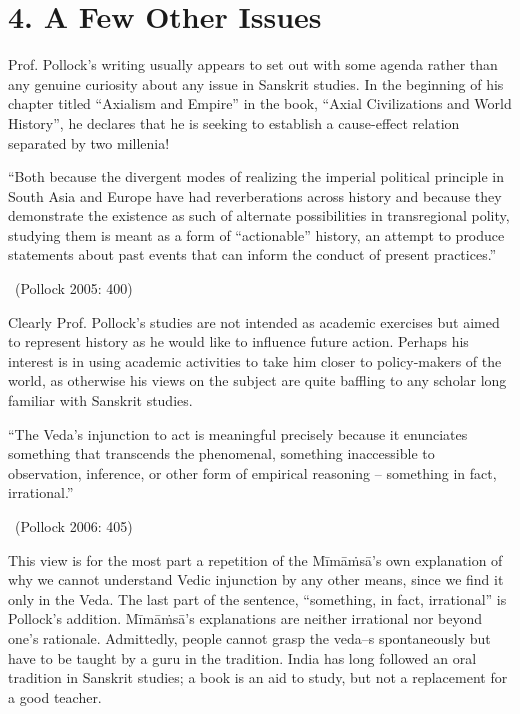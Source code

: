 \section*{4. A Few Other Issues}

Prof. Pollock’s writing usually appears to set out with some agenda rather than any genuine curiosity about any issue in Sanskrit studies. In the beginning of his chapter titled “Axialism and Empire” in the book, “Axial Civilizations and World History”, he declares that he is seeking to establish a cause-effect relation separated by two millenia!

\begin{myquote}
“Both because the divergent modes of realizing the imperial political principle in South Asia and Europe have had reverberations across history and because they demonstrate the existence as such of alternate possibilities in transregional polity, studying them is meant as a form of “actionable” history, an attempt to produce statements about past events that can inform the conduct of present practices.” 

~\hfill (Pollock 2005: 400)
\end{myquote}

Clearly Prof. Pollock’s studies are not intended as academic exercises but aimed to represent history as he would like to influence future action. Perhaps his interest is in using academic activities to take him closer to policy-makers of the world, as otherwise his views on the subject are quite baffling to any scholar long familiar with Sanskrit studies.

\begin{myquote}
“The Veda’s injunction to act is meaningful precisely because it enunciates something that transcends the phenomenal, something inaccessible to observation, inference, or other form of empirical reasoning -- something in fact, irrational.” 

~\hfill (Pollock 2006: 405)
\end{myquote}

This view is for the most part a repetition of the Mīmāṁsā’s own explanation of why we cannot understand Vedic injunction by any other means, since we find it only in the Veda. The last part of the sentence, “something, in fact, irrational” is Pollock’s addition. Mīmāṁsā’s explanations are neither irrational nor beyond one’s rationale. Admittedly, people cannot grasp the veda--s spontaneously but have to be taught by a guru in the tradition. India has long followed an oral tradition in Sanskrit studies; a book is an aid to study, but not a replacement for a good teacher. 

